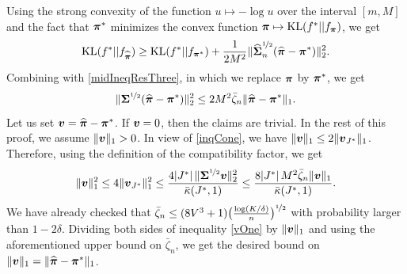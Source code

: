 Using the strong convexity of the function $u\mapsto -\log u$ over the interval $[m,M]$ and
the fact that $\boldsymbol \pi^*$ minimizes the convex function $\boldsymbol \pi\mapsto{\rm KL}(f^*||f_{\boldsymbol \pi})$, we get
\begin{equation}
{\rm KL}(f^*||f_{\widehat{\boldsymbol \pi}}) \ge {\rm KL}(f^*||f_{\boldsymbol \pi^*})+\frac1{2M^2} \|\widehat{\boldsymbol\Sigma}_n^{\nicefrac12}(\widehat{\boldsymbol \pi}-
\boldsymbol \pi^*)\|_2^2.
\end{equation}
Combining with \eqref{midIneqResThree}, in which we replace $\boldsymbol \pi$ by $\boldsymbol \pi^*$, we get
\begin{equation}\label{midIneqResFr}
\|\boldsymbol\Sigma^{\nicefrac12}(\widehat{\boldsymbol \pi}-\boldsymbol \pi^*)\|_2^2 \le 2 M^2\bar\zeta_n\|\widehat{\boldsymbol \pi}-\boldsymbol \pi^*\|_1.
\end{equation}
Let us set $\boldsymbol v = \widehat{\boldsymbol \pi}-\boldsymbol \pi^*$. If $\boldsymbol v=0$, then the claims are trivial. In the rest of this
proof, we assume $\|\boldsymbol v\|_1>0$. In view of \eqref{inqCone}, we have
$\|\boldsymbol v\|_1\le 2\|\boldsymbol v_{J^*}\|_1$. Therefore, using the definition of the compatibility
factor, we get
\begin{equation}\label{vOne}
\|\boldsymbol v\|_1^2\le 4\|\boldsymbol v_{J^*}\|_1^2\le \frac{4|J^*|\,\|\boldsymbol\Sigma^{\nicefrac12}\boldsymbol v\|_2^2}
{\bar\kappa(J^*,1)} \le \frac{8|J^*|\,M^2\bar\zeta_n\|\boldsymbol v\|_1}{\bar\kappa(J^*,1)}.
\end{equation}
We have already checked that $\bar\zeta_n \le (8V^3+1)\big(\frac{\log(K/\delta)}{n}
\big)^{\nicefrac12}$ with probability larger than $1-2\delta$. Dividing both sides of inequality
\eqref{vOne} by $\|\boldsymbol v\|_1$ and using the aforementioned upper bound on $\bar\zeta_n$,
we get the desired bound on $\|\boldsymbol v\|_1=\|\widehat{\boldsymbol \pi}-\boldsymbol \pi^*\|_1$.


